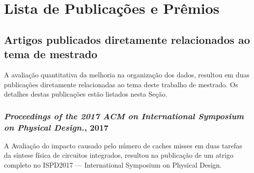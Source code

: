 \chapter{Lista de Publicações e Prêmios}
\label{ap:producoes}
\section{Artigos publicados diretamente relacionados ao tema de mestrado}

A avaliação quantitativa da melhoria na organização dos dados, resultou em duas publicações diretamente relacionadas ao tema deste trabalho de mestrado. Os detalhes destas publicações estão listados nesta Seção.

\subsection{\textit{Proceedings of the 2017 ACM on International Symposium on Physical Design.}, 2017}

A Avaliação do impacto causado pelo número de caches misses em duas tarefas da síntese física de circuitos integrados, resultou na publicação de um atrigo completo no ISPD2017 --- International Symposium on Physical Design.

